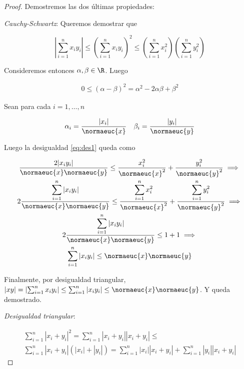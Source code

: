\begin{proof}
    Demostremos las dos últimas propiedades:
    
    \textit{Cauchy-Schwartz}: Queremos demostrar que
    
    \[
    \left| \sum_{i=1}^n x_iy_i \right| \leq \left( \sum_{i=1}^n x_iy_i \right)^2 \leq \left( \sum_{i=1}^n x_i^2 \right)\left( \sum_{i=1}^n y_i^2 \right)
    \]
    
    Consideremos entonces $\alpha, \beta \in \R$. Luego
    
    \begin{gather}\label{eq:des1}
        0 \leq (\alpha - \beta)^2 = \alpha^2 - 2\alpha\beta + \beta^2
    \end{gather}
    
    Sean para cada $i = 1, \dots, n$
    
    \[
    \alpha_i = \frac{|x_i|}{\normaeuc{x}} \quad \beta_i = \frac{|y_i|}{\normaeuc{y}}
    \]
    
    Luego la desigualdad \ref{eq:des1} queda como
    
    \begin{gather*}
        \frac{2|x_iy_i|}{\normaeuc{x}\normaeuc{y}} \leq \frac{x_i^2}{\normaeuc{x}^2} + \frac{y_i^2}{\normaeuc{y}^2} \implies \\
        2 \frac{\displaystyle \sum_{i=1}^n |x_iy_i|}{\normaeuc{x}\normaeuc{y}} \leq \frac{\displaystyle \sum_{i=1}^n x_i^2}{\normaeuc{x}^2} + \frac{\displaystyle \sum_{i=1}^n y_i^2}{\normaeuc{y}^2} \implies \\
        2 \frac{\displaystyle \sum_{i=1}^n |x_iy_i|}{\normaeuc{x}\normaeuc{y}} \leq 1 + 1 \implies \\
        \sum_{i=1}^n |x_iy_i| \leq \normaeuc{x}\normaeuc{y}
    \end{gather*}
    
    Finalmente, por desigualdad triangular, $|xy| = \left|\sum_{i=1}^n x_iy_i\right| \leq \sum_{i=1}^n |x_iy_i| \leq \normaeuc{x}\normaeuc{y}$. Y queda demostrado.
    
    \textit{Desigualdad triangular}: 
    
    \begin{gather*}
        \sum_{i=1}^n |x_i + y_i|^2 = \sum_{i=1}^n |x_i + y_i| |x_i + y_i| \leq \\
        \sum_{i=1}^n |x_i + y_i|\left( |x_i| + |y_i| \right) = \sum_{i=1}^n |x_i||x_i + y_i| + \sum_{i=1}^n |y_i||x_i + y_i|
    \end{gather*}
    

\end{proof}
